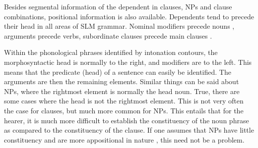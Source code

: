 
Besides segmental information of the dependent in clauses, NPs and clause combinations, positional information is also available. Dependents tend to precede their head in all areas of SLM grammar. Nominal modifiers precede nouns , arguments precede verbs, subordinate clauses precede main clauses .

Within the phonological phrases identified by intonation contours, the morphosyntactic head is normally to the right, and modifiers are to the left. This means that the predicate (head) of a sentence can easily be identified. The arguments are then the remaining elements. Similar things can be said about NPs, where the rightmost element is normally the head noun. True, there are some cases where the head is not the rightmost element. This is not very often the case for clauses, but much more common for NPs. This entails that for the hearer, it is much more difficult to establish the constituency of the noun phrase as compared to the constituency of the clause. If one assumes that NPs have little constituency and are more appositional in nature , this need not be a problem.

